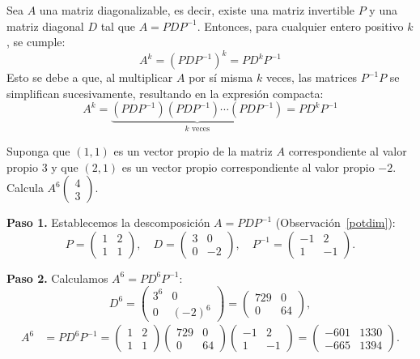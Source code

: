 \begin{rem}\label{potdim}
Sea $A$ una matriz diagonalizable, es decir, existe una matriz invertible $P$ y una matriz diagonal $D$ tal que $A = P D P^{-1}$. Entonces, para cualquier entero positivo $k$, se cumple:
\[
A^k = (P D P^{-1})^k = P D^k P^{-1}
\]
Esto se debe a que, al multiplicar $A$ por sí misma $k$ veces, las matrices $P^{-1}P$ se simplifican sucesivamente, resultando en la expresión compacta:
\[
A^k = \underbrace{(P D P^{-1})(P D P^{-1}) \cdots (P D P^{-1})}_{k \text{ veces}} = P D^k P^{-1}
\]
\end{rem}

\begin{example}
Suponga que $(1,1)$ es un vector propio de la matriz $A$ correspondiente al valor propio $3$ y que $(2,1)$ es un vector propio correspondiente al valor propio $-2$. Calcula $A^6 \begin{pmatrix} 4 \\ 3 \end{pmatrix}$.
\begin{myproof}
\textbf{Paso 1.} Establecemos la descomposición $A=PDP^{-1}$ (Observación~\ref{potdim}):
\[
P = \begin{pmatrix} 1 & 2 \\ 1 & 1 \end{pmatrix}, \quad D = \begin{pmatrix} 3 & 0 \\ 0 & -2 \end{pmatrix}, \quad P^{-1} = \begin{pmatrix} -1 & 2 \\ 1 & -1 \end{pmatrix}.
\]

\textbf{Paso 2.} Calculamos $A^6 = PD^6P^{-1}$:
\[
D^6 = \begin{pmatrix} 3^6 & 0 \\ 0 & (-2)^6 \end{pmatrix} = \begin{pmatrix} 729 & 0 \\ 0 & 64 \end{pmatrix},
\]
\begin{align*}
A^6 &= P D^6 P^{-1} =
\begin{pmatrix} 1 & 2 \\ 1 & 1 \end{pmatrix}
\begin{pmatrix} 729 & 0 \\ 0 & 64 \end{pmatrix}
\begin{pmatrix} -1 & 2 \\ 1 & -1 \end{pmatrix}
= \begin{pmatrix} -601 & 1330 \\ -665 & 1394 \end{pmatrix}.
\end{align*}


\end{myproof}
\end{example}
